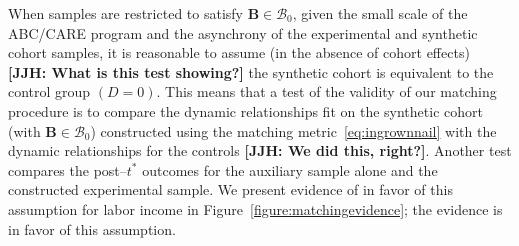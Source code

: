 When samples are restricted to satisfy $\bm{B} \in \mathcal{B}_0$, given the small scale of the ABC/CARE program and the asynchrony of the experimental and synthetic cohort samples, it is reasonable to assume (in the absence of cohort effects) \textbf{[JJH: What is this test showing?]} the synthetic cohort is equivalent to the control group $(D=0)$. This means that a test of the validity of our matching procedure is to compare the dynamic relationships fit on the synthetic cohort (with $\bm{B} \in \mathcal{B}_0$) constructed using the matching metric~\eqref{eq:ingrownnail} with the dynamic relationships for the controls \textbf{[JJH: We did this, right?]}. Another test compares the post--$t^*$ outcomes for the auxiliary sample alone and the constructed experimental sample. We present evidence of in favor of this assumption for labor income in Figure~\ref{figure:matchingevidence}; the evidence is in favor of this assumption.

